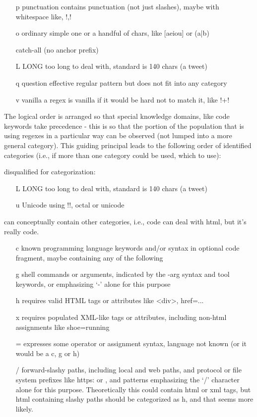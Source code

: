 \begin{itemize}
\item[ p ] punctuation   contains punctuation (not just slashes), maybe with whitespace like, \cverb!\s*,\s*!
\item[ o ] ordinary         simple one or a handful of chars, like [aeiou] or (a|b)


catch-all (no anchor prefix)
\item[ L ] LONG        too long to deal with, standard is 140 chars (a tweet)
\item[ q ] question    effective regular pattern but does not fit into any category
\item[ v ] vanilla     a regex is vanilla if it would be hard not to match it, like \cverb!\w+!
\end{itemize}

The logical order is arranged so that special knowledge domains, like code keywords take precedence - this is so that the portion of the population that is using regexes in a particular way can be observed (not lumped into a more general category).  This guiding principal leads to the following order of identified categories (i.e., if more than one category could be used, which to use):

disqualified for categorization:
\begin{itemize}
\item[ L ] LONG        too long to deal with, standard is 140 chars (a tweet)
\item[ u ] Unicode          using \cverb!\x[a-f0-9][a-f0-9]!, octal or unicode
\end{itemize}

can conceptually contain other categories, i.e., code can deal with html, but it's really code.
\begin{itemize}
\item[ c ] known programming language keywords and/or syntax in optional code fragment, maybe containing any of the following
\item[ g ] shell commands or arguments, indicated by the -arg syntax and tool keywords, or emphasizing `-' alone for this purpose
\item[ h ] requires valid HTML tags or attributes like <div>,  href=...
\item[ x ] requires populated XML-like tags or attributes, including non-html assignments like shoe=running
\item[ = ] expresses some operator or assignment syntax, language not known (or it would be a c, g or h)
\item[ / ] forward-slashy paths, including local and web paths, and protocol or file system prefixes like https: or , and patterns emphasizing the `/' character alone for this purpose.  Theoretically this could contain html or xml tags, but html containing slashy paths should be categorized as h, and that seems more likely.
\end{itemize}

